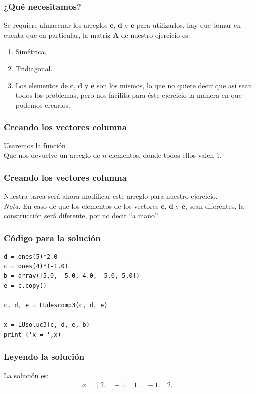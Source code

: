 \documentclass[12pt]{beamer}
\begin{document}
\begin{frame}
\frametitle{¿Qué necesitamos?}
Se requiere almacenar los arreglos $\mathbf{c}$, $\mathbf{d}$ y $\mathbf{e}$ para utilizarlos, hay que tomar en cuenta que en particular, la matriz $\mathbf{A}$ de nuestro ejercicio es:
\pause
{}
\begin{enumerate}[<+->]
\item Simétrica.
\item Tridiagonal.
\item Los elementos de $\mathbf{c}$, $\mathbf{d}$ y $\mathbf{e}$ son los mismos, lo que no quiere decir que así sean todos los problemas, pero nos facilita para éste ejercicio la manera en que podemos crearlos.
\end{enumerate}
\end{frame}
\begin{frame}
\frametitle{Creando los vectores columna}
Usaremos la función .
\\
\medskip
\pause
Que nos devuelve un arreglo de $n$ elementos, donde todos ellos valen $1$. 
\end{frame}
\begin{frame}
\frametitle{Creando los vectores columna}
Nuestra tarea será ahora modificar este arreglo para nuestro ejercicio. 
\\
\medskip
\pause
\emph{Nota: } En caso de que los elementos de los vectores $\mathbf{c}$, $\mathbf{d}$ y $\mathbf{e}$, sean diferentes, la construcción será diferente, por no decir \enquote{a mano}.
\end{frame}
\begin{frame}[fragile]
\frametitle{Código para la solución}
\begin{lstlisting}[caption=Código completo para la solución tridiagonal]
d = ones(5)*2.0
c = ones(4)*(-1.0)
b = array([5.0, -5.0, 4.0, -5.0, 5.0])
e = c.copy()

c, d, e = LUdescomp3(c, d, e)

x = LUsoluc3(c, d, e, b)
print ('x = ',x)
\end{lstlisting}
\end{frame}
\begin{frame}
\frametitle{Leyendo la solución}
La solución es:
\begin{align*}
x = [ 2. \quad -1. \quad 1. \quad -1. \quad 2.]
\end{align*}
\end{frame}
\end{document}
